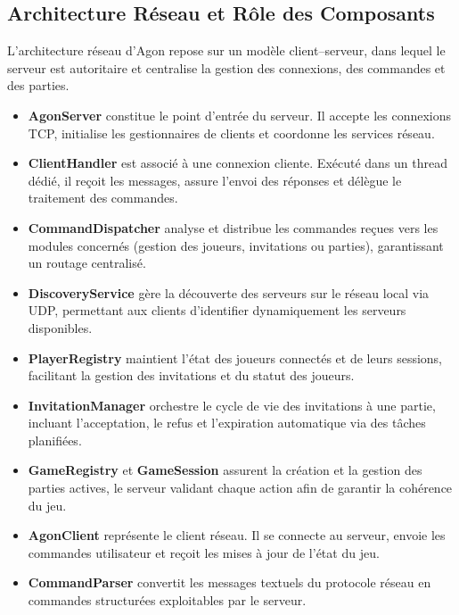 \documentclass[9pt]{extarticle} %
\begin{document}
\subsection{Architecture Réseau et Rôle des Composants}

L’architecture réseau d’Agon repose sur un modèle client–serveur, dans lequel le serveur
est autoritaire et centralise la gestion des connexions, des commandes et des parties.

\begin{itemize}
    \item \textbf{AgonServer} constitue le point d’entrée du serveur. Il accepte les connexions TCP,
    initialise les gestionnaires de clients et coordonne les services réseau.

    \item \textbf{ClientHandler} est associé à une connexion cliente. Exécuté dans un thread dédié,
    il reçoit les messages, assure l’envoi des réponses et délègue le traitement des commandes.

    \item \textbf{CommandDispatcher} analyse et distribue les commandes reçues vers les modules
    concernés (gestion des joueurs, invitations ou parties), garantissant un routage centralisé.

    \item \textbf{DiscoveryService} gère la découverte des serveurs sur le réseau local via UDP,
    permettant aux clients d’identifier dynamiquement les serveurs disponibles.

    \item \textbf{PlayerRegistry} maintient l’état des joueurs connectés et de leurs sessions,
    facilitant la gestion des invitations et du statut des joueurs.

    \item \textbf{InvitationManager} orchestre le cycle de vie des invitations à une partie,
    incluant l’acceptation, le refus et l’expiration automatique via des tâches planifiées.

    \item \textbf{GameRegistry} et \textbf{GameSession} assurent la création et la gestion des parties
    actives, le serveur validant chaque action afin de garantir la cohérence du jeu.

    \item \textbf{AgonClient} représente le client réseau. Il se connecte au serveur, envoie les
    commandes utilisateur et reçoit les mises à jour de l’état du jeu.

    \item \textbf{CommandParser} convertit les messages textuels du protocole réseau en commandes
    structurées exploitables par le serveur.
\end{itemize}
\end{document}
